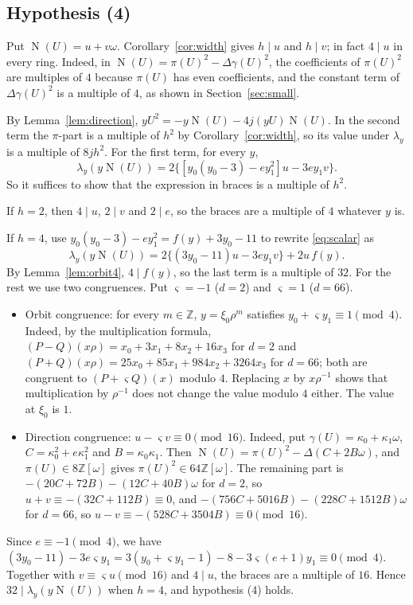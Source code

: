 \documentclass[a4paper,11pt]{article}
\theoremstyle{plain}
\theoremstyle{definition}
\theoremstyle{remark}
\numberwithin{equation}{section}
\numberwithin{table}{section}
\newcommand{\Z}{\mathbb{Z}}
\newcommand{\Nm}{\operatorname{N}}
\begin{document}
\subsection{Hypothesis (4)}\label{sec:hyp4}

Put $\Nm(U)=u+v\omega$. Corollary~\ref{cor:width} gives $h\mid u$ and $h\mid v$; in fact $4\mid u$ in every ring.
Indeed, in $\Nm(U)=\pi(U)^2-\Delta\gamma(U)^2$, the coefficients of $\pi(U)^2$ are multiples of $4$ because $\pi(U)$ has even coefficients, and the constant term of $\Delta\gamma(U)^2$ is a multiple of $4$, as shown in Section~\ref{sec:small}.

By Lemma~\ref{lem:direction}, $yU^2=-y\Nm(U)-4j(yU)\Nm(U)$.
In the second term the $\pi$-part is a multiple of $h^2$ by Corollary~\ref{cor:width}, so its value under $\lambda_y$ is a multiple of $8jh^2$.
For the first term, for every $y$,
\begin{equation}\label{eq:scalar}
\lambda_y(y\Nm(U))=2\bigl\{[y_0(y_0-3)-ey_1^2]u-3ey_1v\bigr\}.
\end{equation}
So it suffices to show that the expression in braces is a multiple of $h^2$.

If $h=2$, then $4\mid u$, $2\mid v$ and $2\mid e$, so the braces are a multiple of $4$ whatever $y$ is.

If $h=4$, use $y_0(y_0-3)-ey_1^2=f(y)+3y_0-11$ to rewrite \eqref{eq:scalar} as
\[
\lambda_y(y\Nm(U))=2\bigl\{(3y_0-11)u-3ey_1v\bigr\}+2u\,f(y).
\]
By Lemma~\ref{lem:orbit4}, $4\mid f(y)$, so the last term is a multiple of $32$.
For the rest we use two congruences. Put $\varsigma=-1$ ($d=2$) and $\varsigma=1$ ($d=66$).
\begin{itemize}
\item Orbit congruence: for every $m\in\Z$, $y=\xi_0\rho^m$ satisfies $y_0+\varsigma y_1\equiv1\pmod4$.
Indeed, by the multiplication formula, $(P-Q)(x\rho)=x_0+3x_1+8x_2+16x_3$ for $d=2$ and $(P+Q)(x\rho)=25x_0+85x_1+984x_2+3264x_3$ for $d=66$; both are congruent to $(P+\varsigma Q)(x)$ modulo $4$. Replacing $x$ by $x\rho^{-1}$ shows that multiplication by $\rho^{-1}$ does not change the value modulo $4$ either. The value at $\xi_0$ is $1$.
\item Direction congruence: $u-\varsigma v\equiv0\pmod{16}$.
Indeed, put $\gamma(U)=\kappa_0+\kappa_1\omega$, $C=\kappa_0^2+e\kappa_1^2$ and $B=\kappa_0\kappa_1$. Then $\Nm(U)=\pi(U)^2-\Delta(C+2B\omega)$, and $\pi(U)\in8\Z[\omega]$ gives $\pi(U)^2\in64\Z[\omega]$. The remaining part is $-(20C+72B)-(12C+40B)\omega$ for $d=2$, so $u+v\equiv-(32C+112B)\equiv0$, and $-(756C+5016B)-(228C+1512B)\omega$ for $d=66$, so $u-v\equiv-(528C+3504B)\equiv0\pmod{16}$.
\end{itemize}
Since $e\equiv-1\pmod4$, we have $(3y_0-11)-3e\varsigma y_1=3(y_0+\varsigma y_1-1)-8-3\varsigma(e+1)y_1\equiv0\pmod4$.
Together with $v\equiv\varsigma u\pmod{16}$ and $4\mid u$, the braces are a multiple of $16$.
Hence $32\mid\lambda_y(y\Nm(U))$ when $h=4$, and hypothesis (4) holds.
\end{document}
